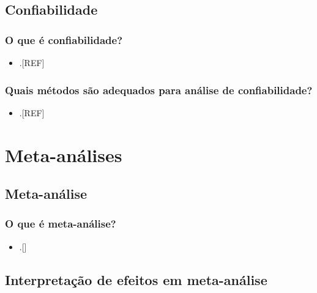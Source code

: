 \documentclass[
]{book}
\providecommand{\tightlist}{%
  \setlength{\itemsep}{0pt}\setlength{\parskip}{0pt}}
\begin{document}
\hypertarget{confiabilidade}{%
\section{Confiabilidade}\label{confiabilidade}}

\hypertarget{o-que-uxe9-confiabilidade}{%
\subsection{O que é confiabilidade?}\label{o-que-uxe9-confiabilidade}}

\begin{itemize}
\tightlist
\item
  .{[}REF{]}
\end{itemize}

\hypertarget{quais-muxe9todos-suxe3o-adequados-para-anuxe1lise-de-confiabilidade}{%
\subsection{Quais métodos são adequados para análise de confiabilidade?}\label{quais-muxe9todos-suxe3o-adequados-para-anuxe1lise-de-confiabilidade}}

\begin{itemize}
\tightlist
\item
  .{[}REF{]}
\end{itemize}

\hypertarget{meta-analises}{%
\chapter{\texorpdfstring{\textbf{Meta-análises}}{Meta-análises}}\label{meta-analises}}

\hypertarget{meta-analise}{%
\section{Meta-análise}\label{meta-analise}}

\hypertarget{o-que-uxe9-meta-anuxe1lise}{%
\subsection{O que é meta-análise?}\label{o-que-uxe9-meta-anuxe1lise}}

\begin{itemize}
\tightlist
\item
  .{[}{]}
\end{itemize}

\hypertarget{interpretacao}{%
\section{Interpretação de efeitos em meta-análise}\label{interpretacao}}
\end{document}
